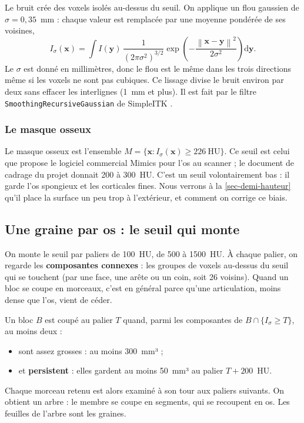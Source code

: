 \documentclass[11pt,a4paper]{article}
\newcommand{\vb}[1]{\mathbf{#1}}
\newcommand{\norm}[1]{\left\lVert #1 \right\rVert}
\begin{document}
Le bruit crée des voxels isolés au-dessus du seuil. On applique un flou gaussien de $\sigma = 0{,}35$~mm : chaque
valeur est remplacée par une moyenne pondérée de ses voisines,
\begin{equation}
  I_\sigma(\vb{x}) = \int I(\vb{y})\, \frac{1}{(2\pi\sigma^2)^{3/2}} \exp\!\left(-\frac{\norm{\vb{x}-\vb{y}}^2}{2\sigma^2}\right) \mathrm{d}\vb{y}.
\end{equation}
Le $\sigma$ est donné en millimètres, donc le flou est le même dans les trois directions même si les voxels ne sont
pas cubiques. Ce lissage divise le bruit environ par deux sans effacer les interlignes (1~mm et plus). Il est fait par
le filtre \texttt{SmoothingRecursiveGaussian} de SimpleITK \cite{lowekamp2013}.

\subsubsection{Le masque osseux}

Le masque osseux est l'ensemble $M = \{\vb{x} : I_\sigma(\vb{x}) \geq 226~\mathrm{HU}\}$. Ce seuil est celui que
propose le logiciel commercial Mimics pour l'os au scanner ; le document de cadrage du projet donnait 200 à 300~HU.
C'est un seuil volontairement bas : il garde l'os spongieux et les corticales fines. Nous verrons à la
\cref{sec-demi-hauteur} qu'il place la surface un peu trop à l'extérieur, et comment on corrige ce biais.

\subsection{Une graine par os : le seuil qui monte}
\label{sec-graines}

On monte le seuil par paliers de 100~HU, de 500 à 1500~HU. À chaque palier, on regarde les \textbf{composantes
connexes} : les groupes de voxels au-dessus du seuil qui se touchent (par une face, une arête ou un coin, soit 26
voisins). Quand un bloc se coupe en morceaux, c'est en général parce qu'une articulation, moins dense que l'os, vient
de céder.

Un bloc $B$ est coupé au palier $T$ quand, parmi les composantes de $B \cap \{I_\sigma \geq T\}$, au moins deux :
\begin{itemize}
  \item sont assez grosses : au moins 300~mm³ ;
  \item et \textbf{persistent} : elles gardent au moins 50~mm³ au palier $T + 200$~HU.
\end{itemize}
Chaque morceau retenu est alors examiné à son tour aux paliers suivants. On obtient un arbre : le membre se coupe en
segments, qui se recoupent en os. Les feuilles de l'arbre sont les graines.
\end{document}
